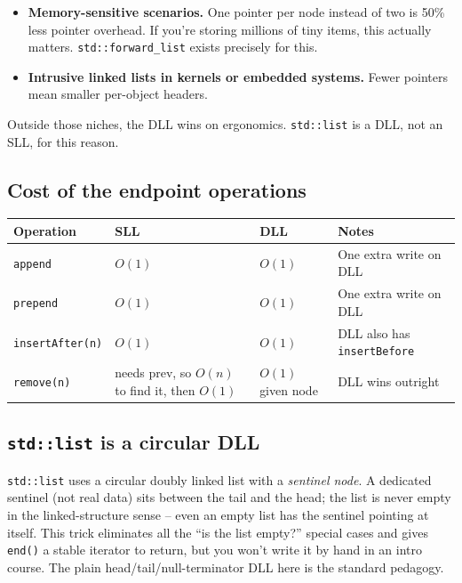 \documentclass[11pt]{article}
\begin{document}
\begin{warnbox}
\begin{itemize}[leftmargin=*]
  \item \textbf{Memory-sensitive scenarios.} One pointer per node
        instead of two is 50\% less pointer overhead. If you're
        storing millions of tiny items, this actually matters.
        \texttt{std::forward\_list} exists precisely for this.
  \item \textbf{Intrusive linked lists in kernels or embedded
        systems.} Fewer pointers mean smaller per-object headers.
\end{itemize}
Outside those niches, the DLL wins on ergonomics. \texttt{std::list}
is a DLL, not an SLL, for this reason.
\end{warnbox}

\subsection{Cost of the endpoint operations}

\begin{center}
\footnotesize
\renewcommand{\arraystretch}{1.3}
\begin{tabular}{@{}llll@{}}
\hline
\textbf{Operation}    & \textbf{SLL} & \textbf{DLL} & \textbf{Notes} \\
\hline
\texttt{append}       & $O(1)$       & $O(1)$        & One extra write on DLL \\
\texttt{prepend}      & $O(1)$       & $O(1)$        & One extra write on DLL \\
\texttt{insertAfter(n)} & $O(1)$    & $O(1)$        & DLL also has \texttt{insertBefore} \\
\texttt{remove(n)}   & needs prev, so $O(n)$ to find it, then $O(1)$ & $O(1)$ given node & DLL wins outright \\
\hline
\end{tabular}
\end{center}

\subsection{\texttt{std::list} is a circular DLL}

\begin{notebox}
\texttt{std::list} uses a circular doubly linked list with a
\emph{sentinel node}. A dedicated sentinel (not real data) sits
between the tail and the head; the list is never empty in the
linked-structure sense -- even an empty list has the sentinel
pointing at itself. This trick eliminates all the ``is the list
empty?'' special cases and gives \texttt{end()} a stable iterator
to return, but you won't write it by hand in an intro course. The
plain head/tail/null-terminator DLL here is the standard pedagogy.
\end{notebox}
\end{document}
